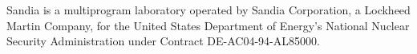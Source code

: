 Sandia is a multiprogram laboratory operated by Sandia Corporation,
a Lockheed Martin Company, for the United States Department of
Energy's National Nuclear Security Administration under Contract
DE-AC04-94-AL85000.
